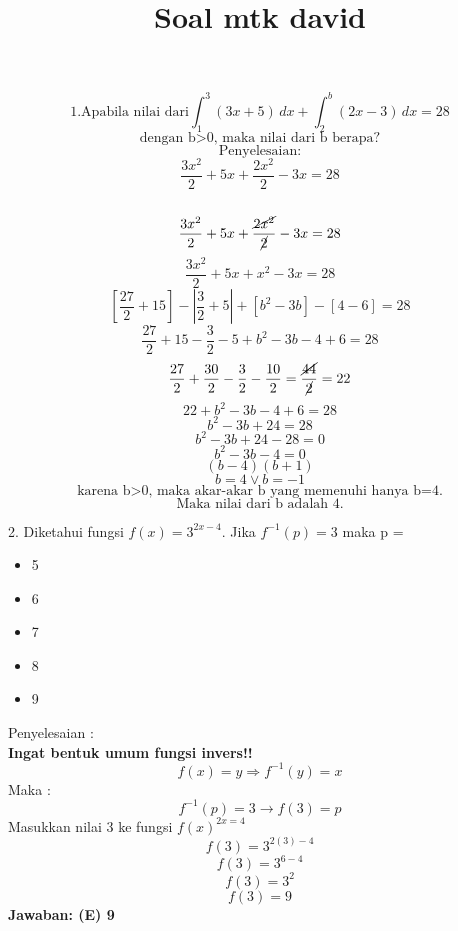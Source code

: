 
\title{Soal mtk david}
\maketitle
\[1. \text{Apabila nilai dari}\int_{1}^{3} (3x+5) \, dx + \int_{2}^{b} (2x-3) \, dx=28 \]
\[\text{dengan b>0, maka nilai dari b berapa?} \]
\[\text{Penyelesaian:}\]
\[\frac{3x^2}{2} + 5x + \frac{2x^2}{2} -3x = 28\]\
\[\frac{3x^2}{2} + 5x + \frac{\cancel{2x^2}}{\cancel{2}} -3x = 28\]
\[\frac{3x^2}{2} + 5x + x^2-3x = 28\]
\[\left[\frac{27}{2}+15\right] - \left|\frac{3}{2}+5\right| + \left[b^2-3b\right] -\left[4-6\right] = 28\]
\[\frac{27}{2}+15 - \frac{3}{2}-5 + b^2 - 3b -4 + 6 = 28 \]
\[\frac{27}{2}+\frac{30}{2} - \frac{3}{2} -\frac{10}{2} = \frac{\cancel{44}}{\cancel2} = 22 \]
\[22+b^2 -3b - 4 + 6 = 28\]
\[b^2 - 3b + 24 = 28\]
\[b^2 -3b +24 - 28 = 0\]
\[b^2 - 3b - 4 = 0\]
\[\left(b-4\right) \left(b+1\right)\]
\[ b = 4 \vee b = -1\]
\[\text{karena b>0, maka akar-akar b yang memenuhi hanya b=4.}\]
\[\boxed{\text{Maka nilai dari b adalah 4.}}\]

2. Diketahui fungsi \(f(x) = 3^{2x-4}\). Jika \(f^{-1}(p) = 3\) maka p = 
\begin{itemize}
    \item[(A)] 5
    \item[(B)] 6
    \item[(C)] 7
    \item[(D)] 8
    \item[(E)] 9
\end{itemize}
Penyelesaian : 
\\
\noindent\textbf{Ingat bentuk umum fungsi invers!!}
\[f (x) = y \Rightarrow f^{-1}(y) = x\]
Maka : 
\[f^{-1} (p) = 3 \rightarrow f (3) = p\]
Masukkan nilai 3 ke fungsi \(f(x)^{2x=4}\) 
\[f(3) = 3^{2(3)-4}\]
\[f(3) = 3^{6-4}\]
\[f(3) = 3^2\]
\[f(3) = 9\]
\textbf{Jawaban: (E) 9}









